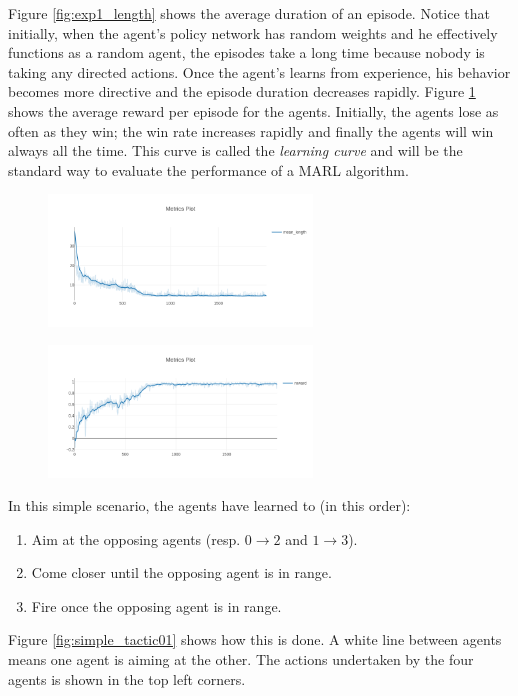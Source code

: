 Figure \ref{fig:exp1_length} shows the average duration of an episode. Notice that initially, when the agent's policy network has random weights and he effectively functions as a random agent, the episodes take a long time because nobody is taking any directed actions. Once the agent's learns from experience, his behavior becomes more directive and the episode duration decreases rapidly. Figure \ref{fig:exp1_reward} shows the average reward per episode for the agents. Initially, the agents lose as often as they win; the win rate increases rapidly and finally the agents will win always all the time. This curve is called the \emph{learning curve} and will be the standard way to evaluate the performance of a MARL algorithm.\\

\begin{figure}
\centering
\begin{minipage}{.5\textwidth}
  \centering
  \includegraphics[width=7cm]{images/experiment3/mean_length.png}
  \label{fig:exp1_length}
\end{minipage}%
\begin{minipage}{.5\textwidth}
  \centering
  \includegraphics[width=7cm]{images/experiment3/mean_reward.png}
  \label{fig:exp1_reward}
\end{minipage}
\end{figure}

In this simple scenario, the agents have learned to (in this order):
\begin{enumerate}
    \item Aim at the opposing agents (resp. $0 \rightarrow 2$ and $1 \rightarrow 3$).
    \item Come closer until the opposing agent is in range.
    \item Fire once the opposing agent is in range.
\end{enumerate}
Figure \ref{fig:simple_tactic01} shows how this is done. A white line between agents means one agent is aiming at the other. The actions undertaken by the four agents is shown in the top left corners.

